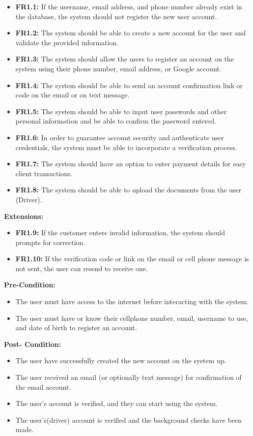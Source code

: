 \documentclass[9pt]{report}
\begin{document}
\begin{itemize}
    \item \textbf{FR1.1:} If the username, email address, and phone number already exist in the database, the system should not register the new user account.
    \item \textbf{FR1.2:} The system should be able to create a new account for the user and validate the provided information.
    \item \textbf{FR1.3:} The system should allow the users to register an account on the system using their phone number, email address, or Google account.
    \item \textbf{FR1.4:} The system should be able to send an account confirmation link or code on the email or on text message.
    \item \textbf{FR1.5:} The system should be able to input user passwords and other personal information and be able to confirm the password entered.
    \item \textbf{FR1.6:} In order to guarantee account security and authenticate user credentials, the system must be able to incorporate a verification process.
    \item \textbf{FR1.7:} The system should have an option to enter payment details for easy client transactions.
    \item \textbf{FR1.8:} The system should be able to upload the documents from the user (Driver).
\end{itemize}
\textbf{Extensions:}
\begin{itemize}
    \item \textbf{FR1.9:} If the customer enters invalid information, the system should prompts for correction.
    \item \textbf{FR1.10:} If the verification code or link on the email or cell phone message is not sent, the user can resend to receive one.
\end{itemize}
\textbf{Pre-Condition:}
\begin{itemize}
    \item The user must have access to the internet before interacting with the system.
    \item The user must have or know their cellphone number, email, username to use, and date of birth to register an account.
\end{itemize}
\textbf{Post- Condition:} 
\begin{itemize}
    \item The user have successfully created the new account on the system up.
    \item The user received an email (or optionally text message) for confirmation of the email account.
    \item The user's account is verified, and they can start using the system.
    \item The user's(driver) account is verified and the background checks have been made.
\end{itemize}
\end{document}
